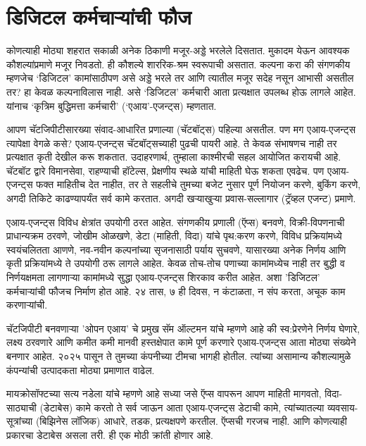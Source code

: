 \chapter{डिजिटल कर्मचाऱ्यांची फौज}

कोणत्याही मोठ्या शहरात सकाळी अनेक ठिकाणी मजूर-अड्डे भरलेले दिसतात. मुकादम येऊन आवश्यक कौशल्यांप्रमाणे मजूर निवडतो. ही कौशल्ये शाररिक-श्रम स्वरूपाची असतात. कल्पना करा की संगणकीय म्हणजेच `डिजिटल' कामांसाठीपण असे अड्डे भरले तर आणि त्यातील मजूर सदेह  नसून आभासी असतील तर? हा केवळ कल्पनाविलास  नाही. असे `डिजिटल' कर्मचारी आता प्रत्यक्षात उपलब्ध होऊ लागले आहेत. यांनाच `कृत्रिम बुद्धिमत्ता कर्मचारी' (`एआय'-एजन्ट्स) म्हणतात. 

आपण चॅटजिपीटीसारख्या संवाद-आधारित प्रणाल्या (चॅटबॉट्स) पहिल्या असतील. पण मग एआय-एजन्ट्स त्यापेक्षा वेगळे कसे? एआय-एजन्ट्स चॅटबॉट्सच्याही पुढची पायरी आहे. ते केवळ संभाषणच नाही तर प्रत्यक्षात कृती देखील करू शकतात. उदाहरणार्थ, तुम्हाला काश्मीरची सहल आयोजित करायची आहे. चॅटबॉट द्वारे विमानसेवा, राहण्याची हॉटेल्स, प्रेक्षणीय स्थळे यांची माहिती घेऊ शकता एवढेच. पण एआय-एजन्ट्स फक्त माहितीच देत नाहीत, तर ते सहलीचे तुमच्या बजेट नुसार पूर्ण नियोजन करणे, बुकिंग करणे, अगदी तिकिटे काढण्यापर्यंत सर्व कामे करतात. अगदी खऱ्याखुऱ्या प्रवास-सल्लागार (ट्रॅव्हल एजन्ट) प्रमाणे. 

एआय-एजन्ट्स  विविध क्षेत्रांत उपयोगी ठरत आहेत. संगणकीय प्रणाली (ऍप्स) बनवणे, विक्री-विपणनाची प्राधान्यक्रम ठरवणे, जोखीम ओळखणे, डेटा (माहिती, विदा) यांचे पृथ:करण करणे, विविध प्रक्रियांमध्ये स्वयंचलितता आणणे, नव-नवीन कल्पनांच्या सृजनासाठी पर्याय सुचवणे, यासारख्या अनेक निर्णय आणि कृती प्रक्रियांमध्ये ते उपयोगी ठरू लागले आहेत. केवळ तोच-तोच पणाच्या कामांमध्येच नाही तर बुद्धी व निर्णयक्षमता लागणाऱ्या कामांमध्ये सुद्धा एआय-एजन्ट्स शिरकाव करीत आहेत. अशा 'डिजिटल' कर्मचाऱ्यांची फौजच निर्माण होत आहे. २४ तास, ७ ही दिवस, न कंटाळता, न संप करता, अचूक काम करणाऱ्यांची. 

चॅटजिपीटी बनवणाऱ्या 'ओपन एआय' चे प्रमुख सॅम ऑल्टमन यांचे म्हणणे आहे की स्व:प्रेरणेने निर्णय घेणारे, लक्ष्य ठरवणारे आणि कमीत कमी मानवी हस्तक्षेपात कामे पूर्ण करणारे एआय-एजन्ट्स आता मोठ्या संख्येने बनणार आहेत. २०२५ पासून ते तुमच्या कंपनीच्या टीमचा भागही होतील. त्यांच्या असामान्य कौशल्यामुळे कंपन्यांची उत्पादकता मोठ्या प्रमाणात वाढेल. 

मायक्रोसॉफ्टच्या सत्य नडेला यांचे म्हणणे आहे सध्या जसे ऍप्स वापरून आपण माहिती मागवतो, विदा-साठ्याची (डेटाबेस) कामे करतो ते सर्व जाऊन आता एआय-एजन्ट्स डेटाची कामे, त्यांच्यातल्या व्यवसाय-सूत्रांच्या (बिझिनेस लॉजिक) आधारे, तडक, प्रत्यक्षपणे करतील. ऍप्सची गरजच नाही. आणि कोणत्याही प्रकारचा डेटाबेस असला तरी. ही एक मोठी क्रांती होणार आहे.

